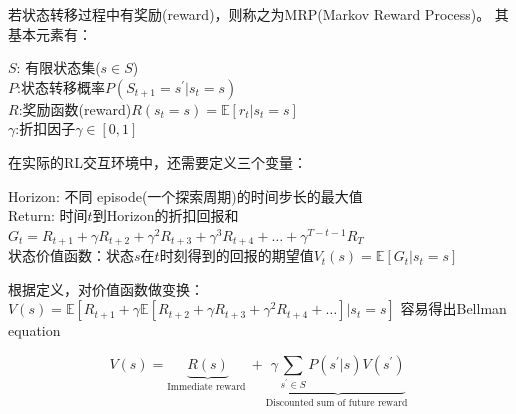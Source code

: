 \documentclass[UTF8]{ctexart}
\begin{document}
若状态转移过程中有奖励(reward)，则称之为MRP(Markov Reward Process)。
其基本元素有：
\begin{adjustwidth}{1.3cm}{0cm}
    $S$: 有限状态集($s \in S$)\\
    $P$:状态转移概率$P\left(S_{t+1}=s^{\prime} | s_{t}=s\right)$\\
    $R$:奖励函数(reward)$R\left(s_{t}=s\right)=\mathbb{E}\left[r_{t} | s_{t}=s\right]$\\
    $\gamma$:折扣因子$\gamma \in[0,1]$
\end{adjustwidth}

在实际的RL交互环境中，还需要定义三个变量：

\begin{adjustwidth}{1.3cm}{0cm}
    Horizon: 不同 episode(一个探索周期)的时间步长的最大值\\
    Return: 时间$t$到Horizon的折扣回报和$G_{t}=R_{t+1}+\gamma R_{t+2}+\gamma^{2} R_{t+3}+\gamma^{3} R_{t+4}+\ldots+\gamma^{T-t-1} R_{T} \label{gt}$\\
    状态价值函数：状态$s$在$t$时刻得到的回报的期望值$V_{t}(s)=\mathbb{E}\left[G_{t} | s_{t}=s\right]$
\end{adjustwidth}

根据定义，对价值函数做变换：$V(s)=\mathbb{E}\left[R_{t+1}+\gamma \mathbb{E}\left[R_{t+2}+\gamma R_{t+3}+
\gamma^{2} R_{t+4}+\ldots\right] | s_{t}=s\right]$
容易得出Bellman equation

\begin{equation}
    V(s)=\underbrace{R(s)}_{\text {Immediate reward }}+
    \underbrace{\gamma \sum_{s^{\prime} \in S} P\left(s^{\prime} | s\right) 
    V\left(s^{\prime}\right)}_{\text {Discounted sum of future reward }}
\end{equation}
\end{document}
